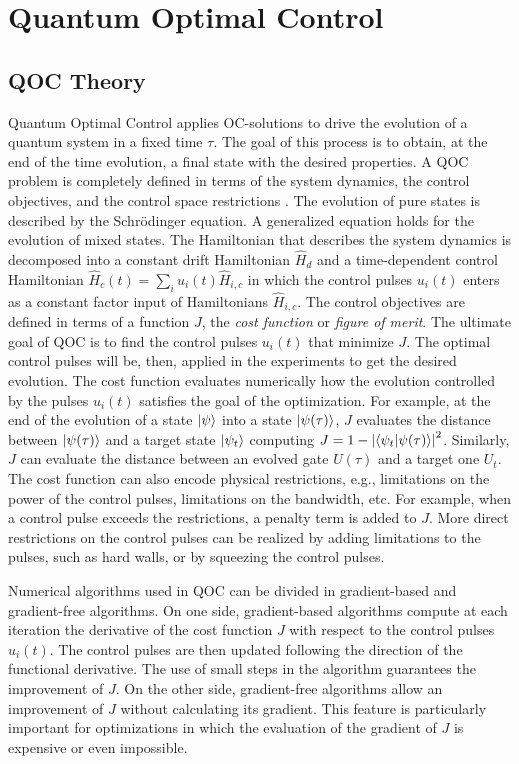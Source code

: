 \documentclass[../main/main.tex]{subfiles}
\begin{document}
\chapter{Quantum Optimal Control}
\section{QOC Theory}
Quantum Optimal Control applies OC-solutions to drive the evolution of a quantum system in a fixed time $\tau$. The goal of this process is to obtain, at the end of the time evolution, a final state with the desired properties. A QOC problem is completely defined in terms of the system dynamics, the control objectives, and the control space restrictions \cite{optimal_control_NV_centers}. The evolution of pure states is described by the Schrödinger equation. A generalized equation holds for the evolution of mixed states. The Hamiltonian that describes the system dynamics is decomposed into a constant drift Hamiltonian $\hat{H}_d$ and a time-dependent control Hamiltonian $\hat{H}_c(t) = \sum_i u_i(t) \hat{H}_{i,c}$ in which the control pulses $u_i(t)$ enters as a constant factor input of Hamiltonians $\hat{H}_{i,c}$. The control objectives are defined in terms of a function $J$, the \textit{cost function} or \textit{figure of merit}. The ultimate goal of QOC is to find the control pulses $u_i(t)$ that minimize $J$. The optimal control pulses will be, then, applied in the experiments to get the desired evolution. The cost function evaluates numerically how the evolution controlled by the pulses $u_i(t)$ satisfies the goal of the optimization. For example, at the end of the evolution of a state $\ket{\psi}$ into a state $\ket{\psi(\tau)}$, $J$ evaluates the distance between $\ket{\psi(\tau)}$ and a target state $\ket{\psi_t}$ computing $J=1-\left|\braket{\psi_t|\psi(\tau)} \right|^2$. Similarly, $J$ can evaluate the distance between an evolved gate $U(\tau)$ and a target one $U_t$. The cost function can also encode physical restrictions, e.g., limitations on the power of the control pulses, limitations on the bandwidth, etc. For example, when a control pulse exceeds the restrictions, a penalty term is added to $J$. More direct restrictions on the control pulses can be realized by adding limitations to the pulses, such as hard walls, or by squeezing the control pulses. \par
Numerical algorithms used in QOC can be divided in gradient-based and gradient-free algorithms. On one side, gradient-based algorithms compute at each iteration the derivative of the cost function $J$ with respect to the control pulses $u_i(t)$. The control pulses are then updated following the direction of the functional derivative. The use of small steps in the algorithm guarantees the improvement of $J$. On the other side, gradient-free algorithms allow an improvement of $J$ without calculating its gradient. This feature is particularly important for optimizations in which the evaluation of the gradient of $J$ is expensive or even impossible.
\end{document}
